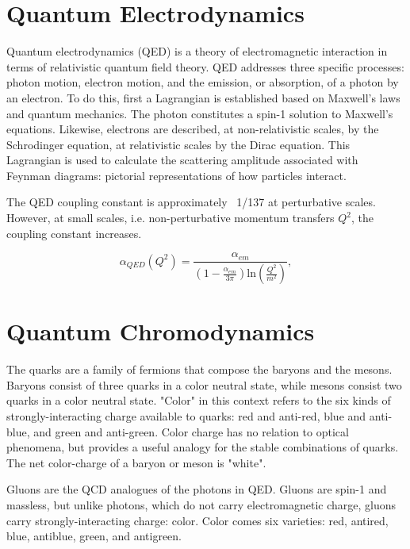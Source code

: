 \section{Quantum Electrodynamics}

Quantum electrodynamics (QED) is a theory of electromagnetic interaction in terms of relativistic quantum field theory. QED addresses three specific processes: photon motion, electron motion, and the emission, or absorption, of a photon by an electron. To do this, first a Lagrangian is established based on Maxwell's laws and quantum mechanics. The photon constitutes a spin-1 solution to Maxwell's equations. Likewise, electrons are described, at non-relativistic scales, by the Schrodinger equation, at relativistic scales by the Dirac equation. This Lagrangian is used to calculate the scattering amplitude associated with Feynman diagrams: pictorial representations of how particles interact.

The QED coupling constant is approximately ~1/137 at perturbative scales. However, at small scales, i.e. non-perturbative momentum transfers $Q^2$, the coupling constant increases.

\begin{equation}
\alpha_{QED}(Q^2) = \frac{ \alpha_{em}}{(1 - \frac{\alpha_{em}}{3\pi})\mathrm{ln}(\frac{Q^2}{m^2}) } ,
\end{equation}



\section{Quantum Chromodynamics}

The quarks are a family of fermions that compose the baryons and the mesons. Baryons consist of three quarks in a color neutral state, while mesons consist two quarks in a color neutral state. "Color" in this context refers to the six kinds of strongly-interacting charge available to quarks: red and anti-red, blue and anti-blue, and green and anti-green. Color charge has no relation to optical phenomena, but provides a useful analogy for the stable combinations of quarks. The net color-charge of a baryon or meson is "white".

Gluons are the QCD analogues of the photons in QED. Gluons are spin-1 and massless, but unlike photons, which do not carry electromagnetic charge, gluons carry strongly-interacting charge: color. Color comes six varieties: red, antired, blue, antiblue, green, and antigreen. 

